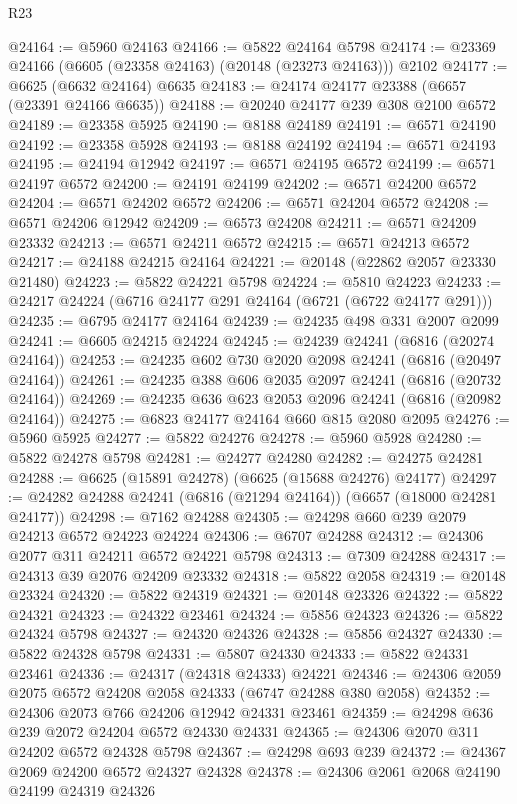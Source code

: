 \begin{lexlean}{R23}
\begin{coremodule}
@24164 := @5960 @24163
@24166 := @5822 @24164 @5798
@24174 := @23369 @24166 (@6605 (@23358 @24163) (@20148 (@23273 @24163))) @2102
@24177 := @6625 (@6632 @24164) @6635
@24183 := @24174 @24177 @23388 (@6657 (@23391 @24166 @6635))
@24188 := @20240 @24177 @239 @308 @2100 @6572
@24189 := @23358 @5925
@24190 := @8188 @24189
@24191 := @6571 @24190
@24192 := @23358 @5928
@24193 := @8188 @24192
@24194 := @6571 @24193
@24195 := @24194 @12942
@24197 := @6571 @24195 @6572
@24199 := @6571 @24197 @6572
@24200 := @24191 @24199
@24202 := @6571 @24200 @6572
@24204 := @6571 @24202 @6572
@24206 := @6571 @24204 @6572
@24208 := @6571 @24206 @12942
@24209 := @6573 @24208
@24211 := @6571 @24209 @23332
@24213 := @6571 @24211 @6572
@24215 := @6571 @24213 @6572
@24217 := @24188 @24215 @24164
@24221 := @20148 (@22862 @2057 @23330 @21480)
@24223 := @5822 @24221 @5798
@24224 := @5810 @24223
@24233 := @24217 @24224 (@6716 @24177 @291 @24164 (@6721 (@6722 @24177 @291)))
@24235 := @6795 @24177 @24164
@24239 := @24235 @498 @331 @2007 @2099
@24241 := @6605 @24215 @24224
@24245 := @24239 @24241 (@6816 (@20274 @24164))
@24253 := @24235 @602 @730 @2020 @2098 @24241 (@6816 (@20497 @24164))
@24261 := @24235 @388 @606 @2035 @2097 @24241 (@6816 (@20732 @24164))
@24269 := @24235 @636 @623 @2053 @2096 @24241 (@6816 (@20982 @24164))
@24275 := @6823 @24177 @24164 @660 @815 @2080 @2095
@24276 := @5960 @5925
@24277 := @5822 @24276
@24278 := @5960 @5928
@24280 := @5822 @24278 @5798
@24281 := @24277 @24280
@24282 := @24275 @24281
@24288 := @6625 (@15891 @24278) (@6625 (@15688 @24276) @24177)
@24297 := @24282 @24288 @24241 (@6816 (@21294 @24164)) (@6657 (@18000 @24281 @24177))
@24298 := @7162 @24288
@24305 := @24298 @660 @239 @2079 @24213 @6572 @24223 @24224
@24306 := @6707 @24288
@24312 := @24306 @2077 @311 @24211 @6572 @24221 @5798
@24313 := @7309 @24288
@24317 := @24313 @39 @2076 @24209 @23332
@24318 := @5822 @2058
@24319 := @20148 @23324
@24320 := @5822 @24319
@24321 := @20148 @23326
@24322 := @5822 @24321
@24323 := @24322 @23461
@24324 := @5856 @24323
@24326 := @5822 @24324 @5798
@24327 := @24320 @24326
@24328 := @5856 @24327
@24330 := @5822 @24328 @5798
@24331 := @5807 @24330
@24333 := @5822 @24331 @23461
@24336 := @24317 (@24318 @24333) @24221
@24346 := @24306 @2059 @2075 @6572 @24208 @2058 @24333 (@6747 @24288 @380 @2058)
@24352 := @24306 @2073 @766 @24206 @12942 @24331 @23461
@24359 := @24298 @636 @239 @2072 @24204 @6572 @24330 @24331
@24365 := @24306 @2070 @311 @24202 @6572 @24328 @5798
@24367 := @24298 @693 @239
@24372 := @24367 @2069 @24200 @6572 @24327 @24328
@24378 := @24306 @2061 @2068 @24190 @24199 @24319 @24326

\end{coremodule}
\end{lexlean}
